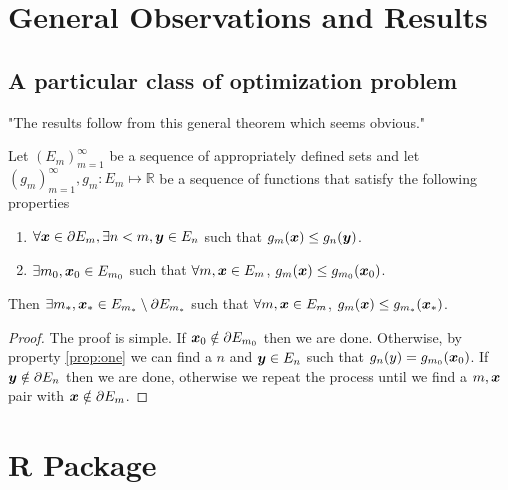 \section{General Observations and Results}
\label{sec:deconvolution observations and results}

\subsection{A particular class of optimization problem}
		"The results follow from this general theorem which seems obvious."

		\begin{theorem}
			\label{thm:solution in interior}
			Let $(E_m)_{m=1}^\infty$ be a sequence of appropriately defined sets and let
			$(g_m)_{m=1}^\infty, g_m: E_m \mapsto \mathbb{R}$ be a sequence of
			functions that satisfy the following properties
			\begin{enumerate}
				\item $\forall {\bm{{x}}} \in \partial E_m, \exists n < m, {\bm{{y}}} \in E_n$ such that
				$g_m({\bm{{x}}}) \leq g_n({\bm{{y}}})$.
				\label{prop:one}
				\item $\exists m_0, {\bm{{x}}}_0 \in E_{m_0}$ such that $\forall m, {\bm{{x}}} \in 
				E_m$, $g_m({\bm{{x}}}) \leq g_{m_0}({\bm{{x}}}_0)$.
			\end{enumerate}
			Then $\exists m_*, {\bm{{x}}}_* \in E_{m_*} \setminus \partial E_{m_*}$ such
			that $\forall m, {\bm{{x}}} \in E_m$, $g_m({\bm{{x}}}) \leq g_{m_*}({\bm{{x}}}_*)$.
		\end{theorem}
		\begin{proof}
			The proof is simple. If ${\bm{{x}}}_0 \notin \partial E_{m_0}$ then we are done.
			Otherwise, by property \ref{prop:one} we can find a $n$ and ${\bm{{y}}} \in 
			E_n$ such that $g_n(y) = g_{m_0}({\bm{{x}}}_0)$. If ${\bm{{y}}} \notin \partial 
			E_n$ then we are done, otherwise we repeat the process until we find a $m, 
			{\bm{{x}}}$ pair with ${\bm{{x}}} \notin \partial E_m$. %
		\end{proof}

\section{R Package}